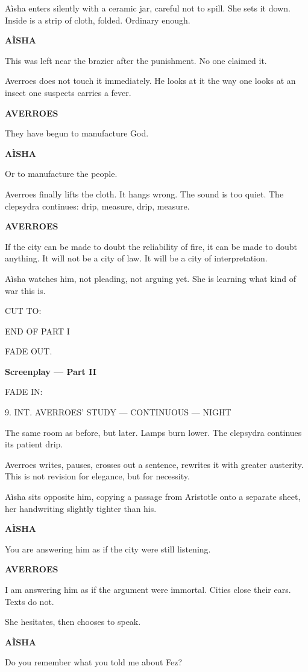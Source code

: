 \documentclass[12pt]{article}
\newlength{\charindent}
\newlength{\dialogueindent}
\newlength{\dialoguewidth}
\newlength{\transitionindent}
\newcommand{\sectionhead}[1]{\vspace{1em}\textbf{#1}\vspace{0.25em}}
\newcommand{\slug}[1]{\vspace{1.25em}\textsc{#1}\vspace{0.5em}}
\newcommand{\action}[1]{#1}
\newcommand{\character}[1]{%
  \par\vspace{0.75em}%
  \hspace*{\charindent}\textbf{#1}%
}
\newcommand{\dialogue}[1]{%
  \par\nobreak
  \hspace*{\dialogueindent}%
  \begin{minipage}[t]{\dialoguewidth}
  #1
  \end{minipage}
}
\newcommand{\transition}[1]{%
  \par\vspace{1em}%
  \hspace*{\transitionindent}\textsc{#1}%
}
\begin{document}
\action{A\`isha enters silently with a ceramic jar, careful not to spill. She sets it down. Inside is a strip of cloth, folded. Ordinary enough.}

\character{A\`ISHA}
\dialogue{This was left near the brazier after the punishment. No one claimed it.}

\action{Averroes does not touch it immediately. He looks at it the way one looks at an insect one suspects carries a fever.}

\character{AVERROES}
\dialogue{They have begun to manufacture God.}

\character{A\`ISHA}
\dialogue{Or to manufacture the people.}

\action{Averroes finally lifts the cloth. It hangs wrong. The sound is too quiet. The clepsydra continues: drip, measure, drip, measure.}

\character{AVERROES}
\dialogue{If the city can be made to doubt the reliability of fire, it can be made to doubt anything. It will not be a city of law. It will be a city of interpretation.}

\action{A\`isha watches him, not pleading, not arguing yet. She is learning what kind of war this is.}

\transition{CUT TO:}

\slug{END OF PART I}

\slug{FADE OUT.}

\sectionhead{Screenplay — Part II}

\slug{FADE IN:}

\slug{9. INT. AVERROES' STUDY --- CONTINUOUS --- NIGHT}

\action{The same room as before, but later. Lamps burn lower. The clepsydra continues its patient drip.}

\action{Averroes writes, pauses, crosses out a sentence, rewrites it with greater austerity. This is not revision for elegance, but for necessity.}

\action{A\`isha sits opposite him, copying a passage from Aristotle onto a separate sheet, her handwriting slightly tighter than his.}

\character{A\`ISHA}
\dialogue{You are answering him as if the city were still listening.}

\character{AVERROES}
\dialogue{I am answering him as if the argument were immortal. Cities close their ears. Texts do not.}

\action{She hesitates, then chooses to speak.}

\character{A\`ISHA}
\dialogue{Do you remember what you told me about Fez?}
\end{document}
